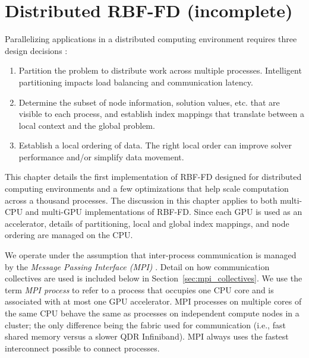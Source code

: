 \documentclass{report}
\begin{document}
\fi


\chapter{Distributed RBF-FD (incomplete)}
\label{chap:distributed_rbffd}



Parallelizing applications in a distributed computing environment requires three
design decisions \cite{Saad2003}: 
\begin{enumerate} 
\item Partition the problem to distribute work across multiple processes. Intelligent partitioning
impacts load balancing and communication latency.
\item Determine the subset of node information,
solution values, etc. that are visible to each process, and establish index mappings that translate between a local context and the global problem. 
\item Establish a local ordering of data. The right local order can improve solver performance and/or simplify data movement. %
\end{enumerate}

This chapter details the first implementation of RBF-FD designed for distributed computing environments and a few optimizations that help scale computation across a thousand processes. The discussion in this chapter applies to both multi-CPU and multi-GPU implementations of RBF-FD. Since each GPU is used as an accelerator, details of partitioning, local and global index mappings, and node ordering are managed on the CPU.  

We operate under the assumption that inter-process communication is managed by the \emph{Message Passing Interface (MPI)} \cite{MPI}. Detail on how communication collectives are used is included below in Section~\ref{sec:mpi_collectives}. We use the term \emph{MPI process} to refer to a process that occupies one CPU core and is associated with at most one GPU accelerator. MPI processes on multiple cores of the same CPU behave the same as processes on independent compute nodes in a cluster; the only difference being the fabric used for communication (i.e., fast shared memory versus a slower QDR Infiniband). MPI always uses the fastest interconnect possible to connect processes. 
\end{document}
